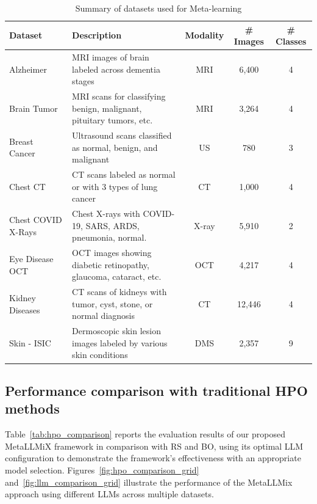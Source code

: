 \documentclass{article}
\begin{document}
\setcounter{table}{1} %
\begin{table}[H] %
\centering
\caption{Summary of datasets used for Meta-learning}
\label{tab:datasets}
\begin{tabularx}{\textwidth}{l >{\RaggedRight}X ccc} %
\toprule
\textbf{Dataset} & \textbf{Description} & \textbf{Modality} & \textbf{\# Images} & \textbf{\# Classes} \\
\midrule
Alzheimer~\cite{tourist55alzheimers} & MRI images of brain labeled across dementia stages & MRI & 6,400 & 4 \\
\addlinespace
Brain Tumor~\cite{sartaj_bhuvaji_ankita_kadam_prajakta_bhumkar_sameer_dedge_swati_kanchan_2020} & MRI scans for classifying benign, malignant, pituitary tumors, etc. & MRI & 3,264 & 4 \\
\addlinespace
Breast Cancer~\cite{al-dhabyani-2019} & Ultrasound scans classified as normal, benign, and malignant & US & 780 & 3 \\
\addlinespace
Chest CT~\cite{chestCTscan} & CT scans labeled as normal or with 3 types of lung cancer & CT & 1,000 & 4 \\
\addlinespace
Chest COVID X-Rays~\cite{cohen2020covidProspective} & Chest X-rays with COVID-19, SARS, ARDS, pneumonia, normal. & X-ray & 5,910 & 2 \\
\addlinespace
Eye Disease OCT~\cite{eyeOCT} & OCT images showing diabetic retinopathy, glaucoma, cataract, etc. & OCT & 4,217 & 4 \\
\addlinespace
Kidney Diseases~\cite{kidneyCT} & CT scans of kidneys with tumor, cyst, stone, or normal diagnosis & CT & 12,446 & 4 \\
\addlinespace
Skin - ISIC~\cite{skinISIC} & Dermoscopic skin lesion images labeled by various skin conditions & DMS & 2,357 & 9 \\
\bottomrule
\end{tabularx}
\end{table}

\subsection{Performance comparison with traditional HPO methods}

Table~\ref{tab:hpo_comparison} reports the evaluation results of our proposed MetaLLMiX framework in comparison with RS and BO, using its optimal LLM configuration to demonstrate the framework’s effectiveness with an appropriate model selection. Figures~\ref{fig:hpo_comparison_grid} and~\ref{fig:llm_comparison_grid} illustrate the performance of the MetaLLMix approach using different LLMs across multiple datasets.
\end{document}
